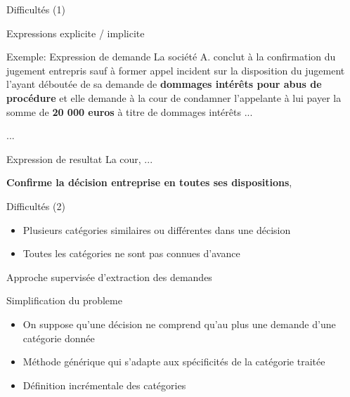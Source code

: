 \documentclass[newPxFont,pagenumber]{beamer}
\begin{document}
\begin{frame}{Difficultés (1)}

Expressions explicite / implicite

\begin{exampleblock}{Exemple: Expression de demande}
La société A. conclut à la confirmation du jugement entrepris sauf à
former appel incident sur la disposition du jugement l'ayant déboutée de sa
demande de \textbf{dommages intérêts pour abus de procédure} et elle demande à la cour de
condamner l'appelante à lui payer la somme de \textbf{20 000 euros} à titre de dommages
intérêts ...


...
\end{exampleblock}

\begin{exampleblock}{Expression de resultat}
La cour, ... 

\textbf{Confirme la décision entreprise en toutes ses dispositions},
\end{exampleblock}
\end{frame}

\begin{frame}{Difficultés (2)}

\begin{alertblock}{}
\begin{itemize}
\item Plusieurs catégories similaires ou différentes dans une décision
\item Toutes les catégories ne sont pas connues d'avance
\end{itemize}
\end{alertblock}
\end{frame}

\begin{frame}{Approche supervisée d'extraction des demandes}
\begin{block}{Simplification du probleme}
\begin{itemize}
\item On suppose qu'une décision ne comprend qu'au plus une demande d'une catégorie donnée
\item Méthode générique qui s'adapte aux spécificités de la catégorie traitée
\item Définition incrémentale des catégories
\end{itemize}
\end{block}

%
\end{frame}
\end{document}
